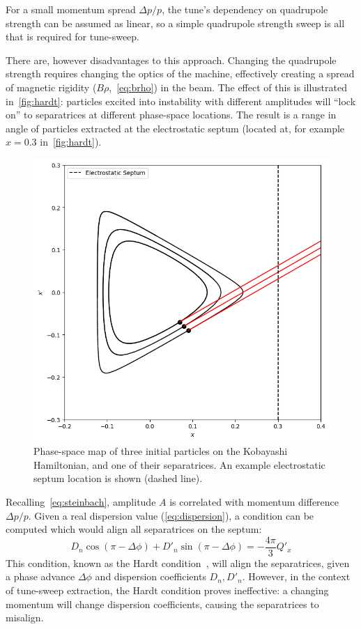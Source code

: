 \documentclass[11pt]{report}
\begin{document}
For a small momentum spread $\Delta p/p$, the tune's dependency on quadrupole strength can be assumed as linear, so a simple quadrupole strength sweep is all that is required for tune-sweep.

There are, however disadvantages to this approach. Changing the quadrupole strength requires changing the optics of the machine, effectively creating a spread of magnetic rigidity ($B\rho$,~\autoref{eq:brho}) in the beam. The effect of this is illustrated in~\autoref{fig:hardt}: particles excited into instability with different amplitudes will ``lock on'' to separatrices at different phase-space locations. The result is a range in angle of particles extracted at the electrostatic septum (located at, for example $x=0.3$ in~\autoref{fig:hardt}).

\begin{figure}
  \centering
  \includegraphics[width=0.6\linewidth]{hardt.png}
  \caption{Phase-space map of three initial particles on the Kobayashi Hamiltonian, and one of their separatrices. An example electrostatic septum location is shown (dashed line).}\label{fig:hardt}
\end{figure}

Recalling~\autoref{eq:steinbach}, amplitude $A$ is correlated with momentum difference $\Delta p/p$. Given a real dispersion value (\autoref{eq:dispersion}), a condition can be computed which would align all separatrices on the septum:
\begin{equation}
  D_n\cos(\pi-\Delta\phi)+D'_n\sin(\pi-\Delta\phi)=-\frac{4\pi}3Q'_x
  \label{eq:hardt}
\end{equation}
This condition, known as the Hardt condition~\cite{hardt}, will align the separatrices, given a phase advance $\Delta\phi$ and dispersion coefficients $D_n, D'_n$. However, in the context of tune-sweep extraction, the Hardt condition proves ineffective: a changing momentum will change dispersion coefficients, causing the separatrices to misalign.
\end{document}
